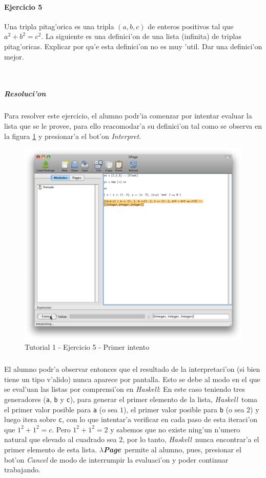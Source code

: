 \documentclass[a4paper]{article}
\newcommand{\haskell}{\textsl{Haskell}}
\newcommand{\hpage}{\textbf{\textsl{$\lambda$Page}}}
\begin{document}
\paragraph{Ejercicio 5}Una tripla pitag'orica es una tripla $(a,b,c)$ de enteros positivos tal que $a^{2} + b^{2} = c^{2}$.  La siguiente es una definici'on de una lista (infinita) de triplas pitag'oricas.  Explicar por qu'e esta definici'on no es muy 'util.  Dar una definici'on mejor.
\begin{center}\begin{lstlisting}
	
\end{lstlisting}\end{center}
\subparagraph{Resoluci'on}Para resolver este ejercicio, el alumno podr'ia comenzar por intentar evaluar la lista que se le provee, para ello reacomodar'a su definici'on tal como se observa en la figura \ref{tut103} y presionar'a el bot'on \textsl{Interpret}.
\begin{figure}[hp]
	\begin{center}
        	\includegraphics[width=.75\textwidth]{pictures/tut1/03}
		\caption{Tutorial 1 - Ejercicio 5 - Primer intento}
		\label{tut103}
	\end{center}
\end{figure}
\subparagraph{}El alumno podr'a observar entonces que el resultado de la interpretaci'on (si bien tiene un tipo v'alido) nunca aparece por pantalla.  Esto se debe al modo en el que se eval'uan las listas por comprensi'on en \haskell: En este caso teniendo tres generadores (\texttt{a}, \texttt{b} y \texttt{c}), para generar el primer elemento de la lista, \haskell\ toma el primer valor posible para \texttt{a} (o sea $1$), el primer valor posible para \texttt{b} (o sea $2$) y luego itera sobre \texttt{c}, con lo que intentar'a verificar en cada paso de esta iteraci'on que $1^{2} + 1^{2} = c$.  Pero $1^{2}+1^{2} = 2$ y sabemos que no existe ning'un n'umero natural que elevado al cuadrado sea $2$, por lo tanto, \haskell\ nunca encontrar'a el primer elemento de esta lista.  \hpage\ permite al alumno, pues, presionar el bot'on \textsl{Cancel} de modo de interrumpir la evaluaci'on y poder continuar trabajando.
\end{document}
